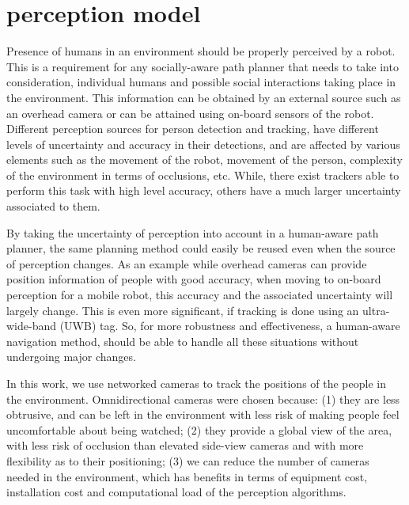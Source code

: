 \section{perception model}
\label{sec: perception model}


Presence of humans in an environment should be properly perceived by a robot. This is a requirement for any socially-aware path planner that needs to take into consideration, individual humans and possible social interactions taking place in the environment. This information can be obtained by an external source such as an overhead camera or can be attained using on-board sensors of the robot. Different perception sources for person detection and tracking, have different levels of uncertainty and accuracy in their detections, and are affected by various elements such as the movement of the robot, movement of the person, complexity of the environment in terms of occlusions, etc. While, there exist trackers able to perform this task with high level accuracy, others have a much larger uncertainty associated to them. 

By taking the uncertainty of perception into account in a human-aware path planner, the same planning method could easily be reused even when the source of perception changes. As an example while overhead cameras can provide position information of people with good accuracy, when moving to on-board perception for a mobile robot, this accuracy and the associated uncertainty will largely change. This is even more significant, if tracking is done using an ultra-wide-band (UWB) tag. So, for more robustness and effectiveness, a human-aware navigation method, should be able to handle all these situations without undergoing major changes.

In this work, we use networked cameras to track the positions of the people in the environment. Omnidirectional cameras were chosen because: (1) they are less obtrusive, and can be left in the environment with less risk
of making people feel uncomfortable about being watched; (2) they provide a global view of the area, with less risk of occlusion than elevated side-view cameras and with more flexibility as to their positioning; (3) we can reduce the number of cameras needed in the environment, which has benefits in terms of equipment cost, installation cost and computational load of the perception algorithms.


